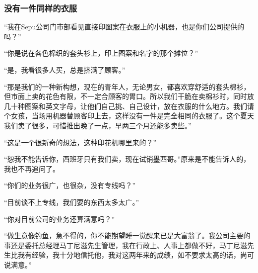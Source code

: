 \subsubsection*{没有一件同样的衣服}
\par “我在Sepu公司门市部看见直接印图案在衣服上的小机器，也是你们公司提供的吗？”
\par “你是说在各色棉织的套头衫上，印上图案和名字的那个摊位？”
\par “是，我看很多人买，总是挤满了顾客。”
\par “那是我们的一种新构想，现在的青年人，无论男女，都喜欢穿舒适的套头棉衫，但市面上卖的花色有限，不一定合顾客的胃口。所以我们干脆在卖棉衫时，同时放几十种图案和英文字母，让他们自己挑、自己设计，放在衣服的什么地方。我们请个女孩，当场用机器替顾客印上去，这样没有一件是完全相同的衣服了。这个夏天我们卖了很多，可惜推出晚了一点，早两三个月还能多卖些。”
\par “这是一个很新奇的想法，这种印花机哪里来的？”
\par “恕我不能告诉你，西班牙只有我们卖，现在试销墨西哥。”原来是不能告诉人的，我也不再追问了。
\par “你们的业务很广，也很杂，没有专线吗？”
\par “目前谈不上专线，我们要的东西太多太广。”
\par “你对目前公司的业务还算满意吗？”
\par “做生意像钓鱼，急不得的，你不能期望睡一觉醒来已是大富翁了。我公司主要的事还是委托总经理马丁尼滋先生管理，我在行政上、人事上都做不好，马丁尼滋先生比我有经验，我十分地信托他，我对这两年来的成绩，如不要求太高的话，尚可说满意。”
